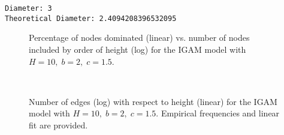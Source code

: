 \documentclass[11pt]{article}
\begin{document}
    \begin{Verbatim}[commandchars=\\\{\}]
Diameter: 3
Theoretical Diameter: 2.4094208396532095
    \end{Verbatim}

    \begin{figure}
    \begin{center}
    \caption{Percentage of nodes dominated (linear) vs. number of nodes included by order of height (log) for the IGAM model with $H = 10, \; b = 2, \; c = 1.5$.}
    \end{center}
    \end{figure}
    { \hspace*{\fill} \\}
    
    \begin{figure}
    \begin{center}
    \caption{Number of edges (log) with respect to height (linear) for the IGAM model with $H = 10, \; b = 2, \; c = 1.5$. Empirical frequencies and linear fit are provided.}
    \end{center}
    \end{figure}
    { \hspace*{\fill} \\}
    
    
%
%   
    
\end{document}
